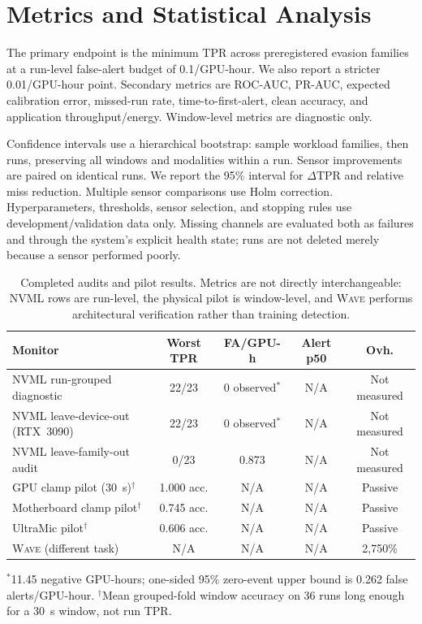 \documentclass[sigplan,anonymous,review,nonacm]{acmart}
\newcommand{\wave}{\textsc{Wave}}
\begin{document}
\section{Metrics and Statistical Analysis}
\label{sec:stats}

The primary endpoint is the minimum TPR across preregistered evasion families at a run-level false-alert budget of 0.1/GPU-hour. We also report a stricter 0.01/GPU-hour point. Secondary metrics are ROC-AUC, PR-AUC, expected calibration error, missed-run rate, time-to-first-alert, clean accuracy, and application throughput/energy. Window-level metrics are diagnostic only.

Confidence intervals use a hierarchical bootstrap: sample workload families, then runs, preserving all windows and modalities within a run. Sensor improvements are paired on identical runs. We report the 95\% interval for $\Delta$TPR and relative miss reduction. Multiple sensor comparisons use Holm correction. Hyperparameters, thresholds, sensor selection, and stopping rules use development/validation data only. Missing channels are evaluated both as failures and through the system's explicit health state; runs are not deleted merely because a sensor performed poorly.

\begin{table}[t]
\centering
\caption{Completed audits and pilot results. Metrics are not directly interchangeable: NVML rows are run-level, the physical pilot is window-level, and \wave{} performs architectural verification rather than training detection.}
\label{tab:primary}
\scriptsize
\begin{tabularx}{\columnwidth}{Xcccc}
\toprule
Monitor & Worst TPR & FA/GPU-h & Alert p50 & Ovh. \\
\midrule
NVML run-grouped diagnostic & 22/23 & 0 observed$^*$ & N/A & Not measured \\
NVML leave-device-out (RTX~3090) & 22/23 & 0 observed$^*$ & N/A & Not measured \\
NVML leave-family-out audit & 0/23 & 0.873 & N/A & Not measured \\
GPU clamp pilot (30~s)$^\dagger$ & 1.000 acc. & N/A & N/A & Passive \\
Motherboard clamp pilot$^\dagger$ & 0.745 acc. & N/A & N/A & Passive \\
UltraMic pilot$^\dagger$ & 0.606 acc. & N/A & N/A & Passive \\
\wave{} (different task) & N/A & N/A & N/A & 2,750\% \\
\bottomrule
\end{tabularx}
\parbox{\columnwidth}{\scriptsize $^*$11.45 negative GPU-hours; one-sided 95\% zero-event upper bound is 0.262 false alerts/GPU-hour. $^\dagger$Mean grouped-fold window accuracy on 36 runs long enough for a 30~s window, not run TPR.}
\end{table}
\end{document}
